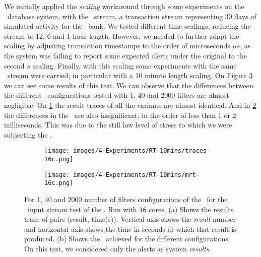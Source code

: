 We initially applied the \emph{scaling} workaround through some experiments on the \smallG\ database system, with the \smallGThirty\  stream, a transaction stream representing 30 days of simulated activity for the \smallG\ bank. We tested different time scalings, reducing the stream to 12, 6 and 1 hour length. However, we needed to further adapt the scaling by adjusting transaction timestamps to the order of microseconds $\mu s$, as the system was failing to report some expected alerts under the original to the second $s$ scaling. Finally, with this scaling some experiments with the same \smallGThirty\ stream were carried; in particular with a 10 minute length scaling. On Figure \ref{fig:exps-RT-10min-16c} we can see some results of this test. We can observe that the differences between the different \DPATM\ configurations tested with 1, 40 and 2000 filters are almost negligible. On \ref{img:exps-RT-10min-16c-trace-1} the result traces of all the variants are almost identical. And in \ref{img:exps-RT-10min-16c-mrt} the differences in the \MRT\ are also insignificant, in the order of less than 1 or 2 milliseconds. This was due to the still low level of stress to which we were subjecting the \DPATM. \\

\begin{figure}[H]
    \centering
    \hspace{-1.5cm} 
    \begin{subfigure}{0.6\textwidth}
        \centering
        \texttt{[image: images/4-Experiments/RT-10mins/traces-16c.png]}
        \caption{}
        \label{img:exps-RT-10min-16c-trace-1}
    \end{subfigure}
    \hfill
    \begin{subfigure}{0.3\textwidth}
        \centering
        \texttt{[image: images/4-Experiments/RT-10mins/mrt-16c.png]}
        \caption{}
        \label{img:exps-RT-10min-16c-mrt}
    \end{subfigure}
    \hspace{-1cm}
    \caption{For 1, 40 and 2000 number of filters configurations of the \DPATM\ for the \smallGThirty\ input stream test of the \smallG. Run with \texttt{16} cores. (a) Shows the results trace of pairs (result, time(s)). Vertical axis shows the \emph{result} number and horizontal axis shows the time in seconds at which that result is produced. (b) Shows the \MRT\ achieved for the different configurations. On this test, we considered only the alerts as system \emph{results}.}
    \label{fig:exps-RT-10min-16c}
\end{figure}

